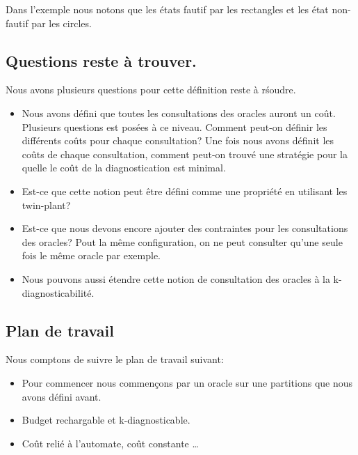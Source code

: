 \documentclass[a4paper,10pt]{article}
\begin{document}
Dans l'exemple nous notons que les \'etats fautif par les rectangles et les \'etat non-fautif par les circles.

\subsection{Questions reste \`a trouver.}

Nous avons plusieurs questions pour cette d\'efinition reste \`a r\'soudre.

\begin{itemize}
\item Nous avons d\'efini que toutes les consultations des oracles auront un co\^ut. Plusieurs questions est pos\'ees \`a ce niveau. Comment peut-on d\'efinir les diff\'erents co\^uts pour chaque consultation? Une fois nous avons d\'efinit les co\^uts de chaque consultation, comment peut-on trouv\'e une strat\'egie pour la quelle le co\^ut de la diagnostication est minimal.

\item Est-ce que cette notion peut \^etre d\'efini comme une propri\'et\'e en utilisant les twin-plant?

\item Est-ce que nous devons encore ajouter des contraintes pour les consultations des oracles? Pout la m\^eme configuration, on ne peut consulter qu'une seule fois le m\^eme oracle par exemple.

\item Nous pouvons aussi \'etendre cette notion de consultation des oracles \`a la k-diagnosticabilit\'e.
\end{itemize}


\subsection{Plan de travail}

Nous comptons de suivre le plan de travail suivant:
\begin{itemize}
\item Pour commencer nous commen\c cons par un oracle sur une partitions que nous avons d\'efini avant.
\item Budget rechargable et k-diagnosticable.
\item Co\^ut reli\'e \`a l'automate, co\^ut constante \dots
\end{itemize}

\end{document}
